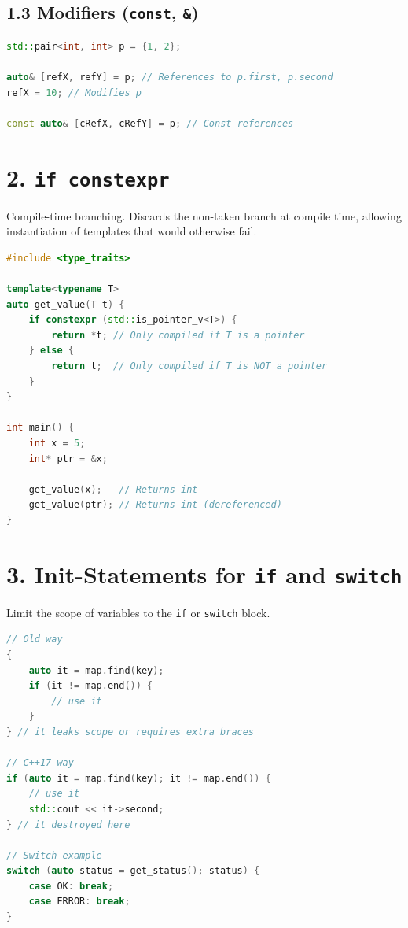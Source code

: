 \hypertarget{modifiers-const}{%
\subsection{\texorpdfstring{1.3 Modifiers (\texttt{const},
\texttt{\&})}{1.3 Modifiers (const, \&)}}\label{modifiers-const}}

\begin{lstlisting}[language={C++}]
std::pair<int, int> p = {1, 2};

auto& [refX, refY] = p; // References to p.first, p.second
refX = 10; // Modifies p

const auto& [cRefX, cRefY] = p; // Const references
\end{lstlisting}

\hypertarget{if-constexpr}{%
\section{\texorpdfstring{2.
\texttt{if\ constexpr}}{2. if constexpr}}\label{if-constexpr}}

Compile-time branching. Discards the non-taken branch at compile time,
allowing instantiation of templates that would otherwise fail.

\begin{lstlisting}[language={C++}]
#include <type_traits>

template<typename T>
auto get_value(T t) {
    if constexpr (std::is_pointer_v<T>) {
        return *t; // Only compiled if T is a pointer
    } else {
        return t;  // Only compiled if T is NOT a pointer
    }
}

int main() {
    int x = 5;
    int* ptr = &x;
    
    get_value(x);   // Returns int
    get_value(ptr); // Returns int (dereferenced)
}
\end{lstlisting}

\hypertarget{init-statements-for-if-and-switch}{%
\section{\texorpdfstring{3. Init-Statements for \texttt{if} and
\texttt{switch}}{3. Init-Statements for if and switch}}\label{init-statements-for-if-and-switch}}

Limit the scope of variables to the \passthrough{\lstinline!if!} or
\passthrough{\lstinline!switch!} block.

\begin{lstlisting}[language={C++}]
// Old way
{
    auto it = map.find(key);
    if (it != map.end()) {
        // use it
    }
} // it leaks scope or requires extra braces

// C++17 way
if (auto it = map.find(key); it != map.end()) {
    // use it
    std::cout << it->second;
} // it destroyed here

// Switch example
switch (auto status = get_status(); status) {
    case OK: break;
    case ERROR: break;
}
\end{lstlisting}

